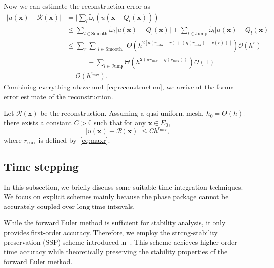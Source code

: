 Now we can estimate the reconstruction error as
\begin{equation}
\begin{aligned}
\lvert u(\mathbf{x}) - \mathcal{R}(\mathbf{x}) \rvert &= \lvert \sum_{l}\tilde{\omega}_l (u(\mathbf{x} - Q_l(\mathbf{x})))  \rvert\\
&\leq \sum_{l \in \text{Smooth}} \tilde{\omega}_l \lvert u(\mathbf{x}) - Q_l(\mathbf{x}) \rvert + \sum_{l \in \text{Jump}} \tilde{\omega}_l \lvert u(\mathbf{x}) - Q_l(\mathbf{x}) \rvert \\
&\leq \sum_r \sum_{\substack{l\in \text{Smooth}_r}} \Theta(h^{2[a(r_{\max} - r) + (\eta(r_{\max}) - \eta(r))]}) \mathcal{O}(h^r) \\
&\quad \qquad + \sum_{l\in \text{Jump}} \Theta (h^{2(ar_{\max}+\eta(r_{\max}))}) \mathcal{O}(1) \\
&= \mathcal{O}(h^{r_{\max}}).
\end{aligned}
\end{equation}
Combining everything above and~\eqref{eq:reconstruction}, we arrive at 
the formal error estimate of the reconstruction.
\begin{lem}
		  Let $\mathcal{R}(\mathbf{x})$ be the reconstruction. Assuming a 
		  qusi-uniform mesh, $h_0 = \Theta(h)$, there exists a constant $C>0$
		  such that for any $\mathbf{x} \in E_0$, 
		  \begin{equation}\label{eq:errorestimate}
					 \lvert u(\mathbf{x}) - \mathcal{R}(\mathbf{x}) \rvert \leq C h^{r_{\max}},
		  \end{equation}
		  where $r_{\max}$ is defined by~\eqref{eq:maxr}.
\end{lem}

\subsection{Time stepping}
In this subsection, we briefly discuss some suitable time integration techniques. 
We focus on explicit schemes mainly because
the phase package cannot be accurately coupled over long time intervals.

While the forward Euler method is sufficient for stability analysis,
it only provides first-order accuracy. Therefore, we employ the strong-stability
preservation (SSP) scheme introduced in~\cite{doi:10.1137/S003614450036757X}.
This scheme achieves higher order time accuracy while theoretically preserving 
the stability properties of the forward Euler method.

